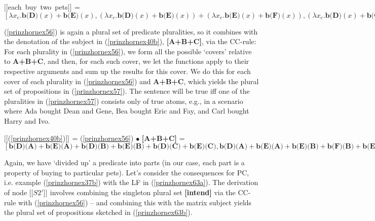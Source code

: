 \documentclass[output=paper,colorlinks,citecolor=brown,
]{langscibook}
\newcommand{\sem}[2]{\mbox{$[\![${#2}$]\!]^{#1}$}} %
\begin{document}
\ea  \sem{}{each buy two pets} = $[\lambda x_{e}. \textbf{b(D)}(x)+ \textbf{b(E)}(x), (\lambda x_{e}.\textbf{b(D)}(x)+\textbf{b(E)}(x))+ (\lambda x_{e}.\textbf{b(E)}(x) +\textbf{b(F)}(x)),  (\lambda x_{e}.\textbf{b(D)}(x)+\textbf{b(G)}(x))+(\lambda x_{e}.\textbf{b(E)}(x)+\textbf{b(F)}(x)) + (\lambda x_{e}. \textbf{b(H)}(x)+\textbf{b(I)}(x)), \dots]$ \label{prinzhornex56} \z

(\ref{prinzhornex56}) is again a plural set of predicate pluralities, so it combines with the denotation of the subject in (\ref{prinzhornex40b}), \textbf{[A+B+C]}, via the CC-rule: For each plurality in (\ref{prinzhornex56}), we form all the possible `covers' relative to \textbf{A+B+C}, and then, for each such cover, we let the functions apply to their respective arguments and sum up the results for this cover. We do this for each cover of each plurality in (\ref{prinzhornex56}) and \textbf{A+B+C}, which yields the plural set of propositions in (\ref{prinzhornex57}). The sentence will be true iff one of the pluralities  in (\ref{prinzhornex57}) consists only of true atoms, e.g., in a scenario where Ada bought Dean and Gene, Bea bought Eric and Fay, and Carl bought Harry and Ivo.


\ea  \sem{}{(\ref{prinzhornex40b})} = (\ref{prinzhornex56}) $\bullet$ \textbf{[A+B+C]} = $[\textbf{b(D)(A)}+\textbf{b(E)(A)}+\textbf{b(D)(B)} +\textbf{b(E)(B)} + \textbf{b(D)(C)} +\textbf{b(E)(C)}, 
\textbf{b(D)(A)}+\textbf{b(E)(A)}+\textbf{b(E)(B)} +\textbf{b(F)(B)} + \textbf{b(E)(C)} +\textbf{b(F)(C)}, 
  \textbf{b(D)(A)}+\textbf{b(G)(A)}+ \textbf{b(E)(B)}+\textbf{b(F)(B)} +  \textbf{b(H)(C)}+\textbf{b(I)(C)}, \dots]$ \label{prinzhornex57} \z


Again, we have `divided up' a predicate into parts (in our case, each part is a property of buying to particular pets). Let's consider the consequences for PC, i.e. example (\ref{prinzhornex37b}) 
with the LF in (\ref{prinzhornex63a}). The derivation of node \sem{}{$S2'$} involves combining the singleton plural set \textbf{[intend]} via the CC-rule with (\ref{prinzhornex56}) -- and combining this with the matrix subject yields the plural set of propositions sketched in (\ref{prinzhornex63b}). 
\end{document}
